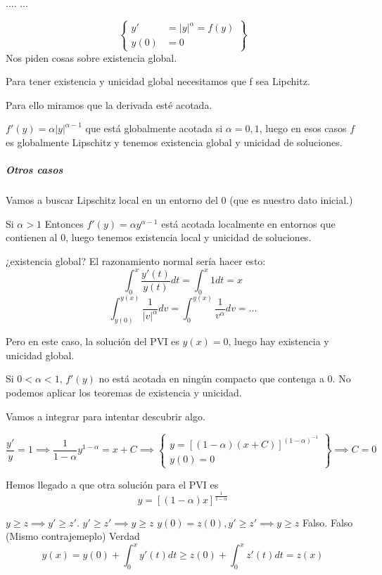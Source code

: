 \documentclass[nochap]{apuntes}
\begin{document}
\begin{problem}[2]
....
\solution
...

\end{problem}
\begin{problem}[10]
\[\left\{ \begin{array}{cc}
y'&=|y|^{\alpha} = f(y)\\
y(0)&=0
\end{array}\right\}\]
Nos piden cosas sobre existencia global.

\solution

Para tener existencia y unicidad global necesitamos que f sea Lipchitz.

Para ello miramos que la derivada esté acotada.

$f'(y) = \alpha |y|^{\alpha-1}$ que está globalmente acotada si $\alpha = 0,1$, luego en esos casos $f$ es globalmente Lipschitz y tenemos existencia global y unicidad de soluciones.

\subparagraph{Otros casos} Vamos a buscar Lipschitz local en un entorno del 0 (que es nuestro dato inicial.)

Si $\alpha >1$ Entonces $f'(y) = \alpha y^{\alpha-1}$ está acotada localmente en entornos que contienen al 0, luego tenemos existencia local y unicidad de soluciones.

¿existencia global? El razonamiento normal sería hacer esto:
\[\int_0^x \frac{y'(t)}{y(t)}dt = \int_0^x1dt=x\]
\[\int_{y(0)}^{y(x)} \frac{1}{|v|^{\alpha}}dv = \int_0^{y(x)} \frac{1}{v^{\alpha}} dv = ...\]

Pero en este caso, la solución del PVI es $y(x) = 0$, luego hay existencia y unicidad global.

Si $0<\alpha<1$, $f'(y)$ no está acotada en ningún compacto que contenga a 0. No podemos aplicar los teoremas de existencia y unicidad.

Vamos a integrar para intentar descubrir algo.

\[\frac{y'}{y}=1 \implies \frac{1}{1-\alpha} y^{1-\alpha} = x+C \implies \left\{ \begin{array}{c}
y=[(1-\alpha)(x+C)]^{(1-\alpha)^{-1}}\\
y(0)=0\end{array}\right\}\implies C=0 \]

Hemos llegado a que otra solución para el PVI es \[y=[(1-\alpha)x]^{\frac{1}{1-\alpha}}\]
\end{problem}

\begin{problem}[11]
\ppart $y\ge z \implies y'\ge z'$.
\ppart $y'\ge z' \implies y\ge z $
\ppart $y(0) = z(0), y'\ge z' \implies y\ge z$
\solution
\spart Falso.
\spart Falso (Mismo contrajemeplo)
\spart Verdad \[y(x)= y(0) + \int_0^x y'(t)dt \ge z(0) + \int_0^x z'(t)dt = z(x)\]
\end{problem}
\end{document}
